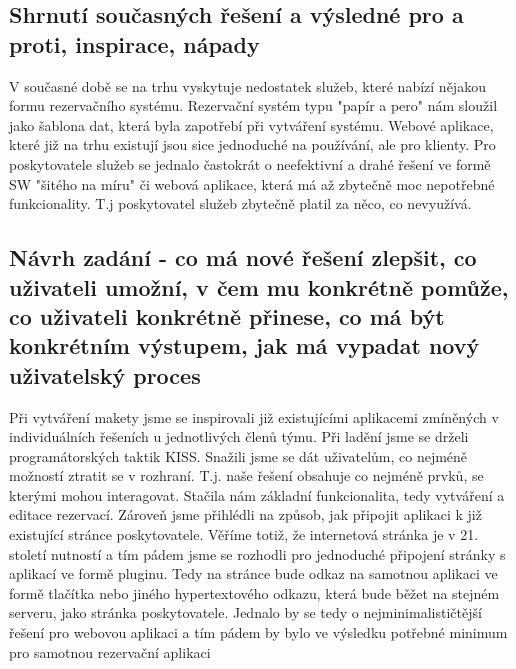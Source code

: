 \subsection{Shrnutí současných řešení a výsledné pro a proti, inspirace, nápady}
V současné době se na trhu vyskytuje nedostatek služeb, které nabízí nějakou formu rezervačního systému. Rezervační systém typu
"papír a pero" nám sloužil jako šablona dat, která byla zapotřebí při vytváření systému.
Webové aplikace, které již na trhu existují jsou sice jednoduché na používání, ale pro klienty. Pro poskytovatele služeb se jednalo častokrát
o neefektivní a drahé řešení ve formě SW "šitého na míru" či webová aplikace, která má až zbytečně moc nepotřebné funkcionality. T.j
poskytovatel služeb zbytečně platil za něco, co nevyužívá.


\subsection{Návrh zadání - co má nové řešení zlepšit, co uživateli umožní, v čem
mu konkrétně pomůže, co uživateli konkrétně přinese, co má být
konkrétním výstupem, jak má vypadat nový uživatelský proces}

Při vytváření makety jsme se inspirovali již existujícími aplikacemi zmíněných v individuálních řešeních u jednotlivých členů týmu.
Při ladění jsme se drželi programátorských taktik KISS. Snažili jsme se dát uživatelům, co nejméně možností ztratit se v rozhraní.
T.j. naše řešení obsahuje co nejméně prvků, se kterými mohou interagovat.
Stačila nám základní funkcionalita, tedy vytváření a editace rezervací.
Zároveň jsme přihlédli na způsob, jak připojit aplikaci k již existující stránce poskytovatele. Věříme totiž, že internetová
stránka je v 21. století nutností a tím pádem jsme se rozhodli pro jednoduché připojení stránky s aplikací ve formě pluginu.
Tedy na stránce bude odkaz na samotnou aplikaci ve formě tlačítka nebo jiného hypertextového odkazu, která bude běžet na stejném
serveru, jako stránka poskytovatele. Jednalo by se tedy o nejminimalističtější řešení pro webovou aplikaci a tím pádem by bylo ve
výsledku potřebné minimum pro samotnou rezervační aplikaci

